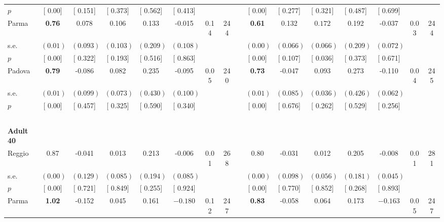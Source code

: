 \begin{longtable}{L{8em} c c c c c c c p{1em} c c c c c c c}
\quad \quad \quad \quad $ p$ & [     0.00] & [    0.151] & [    0.373] & [    0.562] & [    0.413] & & & & [     0.00] & [    0.277] & [    0.321] & [    0.487] & [    0.699] & &  \\[1em]
\quad \quad \quad Parma& \textbf{     0.76} &     0.078 &     0.106 &     0.133 &    -0.015 &      0.14 &       244 & & \textbf{     0.61} &     0.132 & $ \mathbf{    0.172}$ &     0.192 &    -0.037 &      0.03 &       244  \\*
\quad \quad \quad \quad s.e.& $ (     0.01)$ & $ (    0.093)$ & $ (    0.103)$ & $ (    0.209)$ & $ (    0.108)$ & & & & $ (     0.00)$ & $ (    0.066)$ & $ (    0.066)$ & $ (    0.209)$ & $ (    0.072)$ & &  \\*
\quad \quad \quad \quad $ p$ & [     0.00] & [    0.322] & [    0.193] & [    0.516] & [    0.863] & & & & [     0.00] & [    0.107] & [    0.036] & [    0.373] & [    0.671] & &  \\[1em]
\quad \quad \quad Padova& \textbf{     0.79} &    -0.086 &     0.082 &     0.235 &    -0.095 &      0.05 &       240 & & \textbf{     0.73} &    -0.047 &     0.093 &     0.273 &    -0.110 &      0.04 &       245  \\*
\quad \quad \quad \quad s.e.& $ (     0.01)$ & $ (    0.099)$ & $ (    0.073)$ & $ (    0.430)$ & $ (    0.100)$ & & & & $ (     0.01)$ & $ (    0.085)$ & $ (    0.036)$ & $ (    0.426)$ & $ (    0.062)$ & &  \\*
\quad \quad \quad \quad $ p$ & [     0.00] & [    0.457] & [    0.325] & [    0.590] & [    0.340] & & & & [     0.00] & [    0.676] & [    0.262] & [    0.529] & [    0.256] & &  \\[1em]
~\\[1em]
\quad \quad \textbf{Adult 40} & & & & & & & & & & & & & & & \\* 
\quad \quad \quad Reggio& 0.87 &    -0.041 &     0.013 &     0.213 &    -0.006 &      0.01 &       268 & & 0.80 &    -0.031 &     0.012 &     0.205 &    -0.008 &      0.01 &       281  \\*
\quad \quad \quad \quad s.e.& $ (     0.00)$ & $ (    0.129)$ & $ (    0.085)$ & $ (    0.194)$ & $ (    0.085)$ & & & & $ (     0.00)$ & $ (    0.098)$ & $ (    0.056)$ & $ (    0.181)$ & $ (    0.045)$ & &  \\*
\quad \quad \quad \quad $ p$ & [     0.00] & [    0.721] & [    0.849] & [    0.255] & [    0.924] & & & & [     0.00] & [    0.770] & [    0.852] & [    0.268] & [    0.893] & &  \\[1em]
\quad \quad \quad Parma& \textbf{     1.02} &    -0.152 &     0.045 &     0.161 & $ \mathbf{   -0.180}$ &      0.12 &       247 & & \textbf{     0.83} &    -0.058 &     0.064 &     0.173 & $ \mathbf{   -0.163}$ &      0.05 &       247  \\*

\end{longtable}
